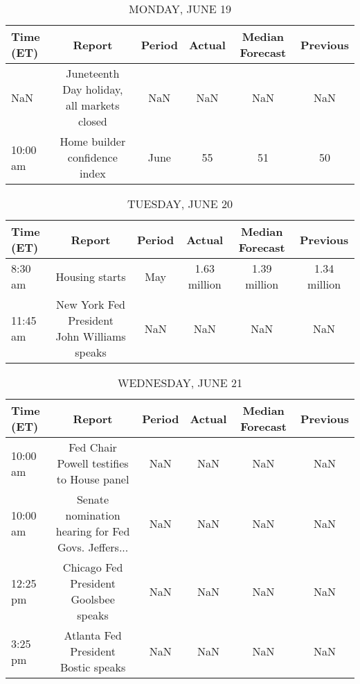 \documentclass{article}%
\begin{document}
%
\normalsize%


\begin{table}[htbp]%
\caption{MONDAY, JUNE 19}%
\centering%
\begin{adjustbox}{width=1\textwidth}%
\begin{tabular}{lccccc}
\toprule
Time (ET) &                                     Report & Period & Actual & Median Forecast & Previous \\
\midrule
      NaN & Juneteenth Day holiday, all markets closed &    NaN &    NaN &             NaN &      NaN \\
 10:00 am &              Home builder confidence index &   June &     55 &              51 &       50 \\
\bottomrule
\end{tabular}
%
\end{adjustbox}%
\end{table}

%


\begin{table}[htbp]%
\caption{TUESDAY, JUNE 20}%
\centering%
\begin{adjustbox}{width=1\textwidth}%
\begin{tabular}{lccccc}
\toprule
Time (ET) &                                      Report & Period &       Actual & Median Forecast &     Previous \\
\midrule
  8:30 am &                              Housing starts &    May & 1.63 million &    1.39 million & 1.34 million \\
 11:45 am & New York Fed President John Williams speaks &    NaN &          NaN &             NaN &          NaN \\
\bottomrule
\end{tabular}
%
\end{adjustbox}%
\end{table}

%


\begin{table}[htbp]%
\caption{WEDNESDAY, JUNE 21}%
\centering%
\begin{adjustbox}{width=1\textwidth}%
\begin{tabular}{lccccc}
\toprule
Time (ET) &                                             Report & Period & Actual & Median Forecast & Previous \\
\midrule
 10:00 am &          Fed Chair Powell testifies to House panel &    NaN &    NaN &             NaN &      NaN \\
 10:00 am & Senate nomination hearing for Fed Govs. Jeffers... &    NaN &    NaN &             NaN &      NaN \\
 12:25 pm &              Chicago Fed President Goolsbee speaks &    NaN &    NaN &             NaN &      NaN \\
  3:25 pm &                Atlanta Fed President Bostic speaks &    NaN &    NaN &             NaN &      NaN \\
\bottomrule
\end{tabular}
%
\end{adjustbox}%
\end{table}
\end{document}
